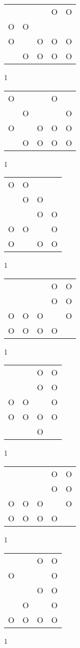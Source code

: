 \begin{tabular}{|m{0.2cm}m{0.2cm}m{0.2cm}m{0.2cm}m{0.2cm}|}\hline
 & & &O&O\\
O&O& & & \\
O& &O&O&O\\
 &O&O&O&O\\
\hline\end{tabular}1
\begin{tabular}{|m{0.2cm}m{0.2cm}m{0.2cm}m{0.2cm}m{0.2cm}|}\hline
O& & &O& \\
 &O& & &O\\
O& &O&O&O\\
 &O&O&O&O\\
\hline\end{tabular}1
\begin{tabular}{|m{0.2cm}m{0.2cm}m{0.2cm}m{0.2cm}|}\hline
O&O& & \\
 &O&O& \\
 & &O&O\\
O&O& &O\\
O& &O&O\\
\hline\end{tabular}1
\begin{tabular}{|m{0.2cm}m{0.2cm}m{0.2cm}m{0.2cm}m{0.2cm}|}\hline
 & & &O&O\\
 & & &O&O\\
O&O&O& &O\\
O&O&O&O& \\
\hline\end{tabular}1
\begin{tabular}{|m{0.2cm}m{0.2cm}m{0.2cm}m{0.2cm}|}\hline
 & &O&O\\
 & &O&O\\
O&O& &O\\
O&O&O&O\\
 & &O& \\
\hline\end{tabular}1
\begin{tabular}{|m{0.2cm}m{0.2cm}m{0.2cm}m{0.2cm}m{0.2cm}|}\hline
 & & &O&O\\
 & & &O&O\\
O&O&O& &O\\
O&O&O&O& \\
\hline\end{tabular}1
\begin{tabular}{|m{0.2cm}m{0.2cm}m{0.2cm}m{0.2cm}|}\hline
 & &O&O\\
O& & &O\\
 & &O&O\\
 &O& &O\\
O&O&O&O\\
\hline\end{tabular}1
